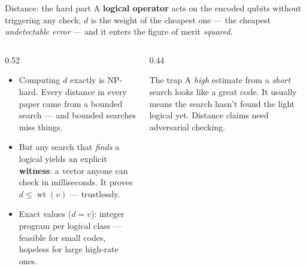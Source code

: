 \documentclass[11pt,aspectratio=169]{beamer}
\newcommand{\wt}{\operatorname{wt}}
\begin{document}
\begin{frame}{Distance: the hard part}
  A \textbf{logical operator} acts on the encoded qubits without triggering any
  check; $d$ is the weight of the cheapest one --- the cheapest
  \emph{undetectable error} --- and it enters the figure of merit
  \emph{squared}.
  \begin{columns}[T]
    \begin{column}{0.52\textwidth}
      \begin{itemize}\setlength{\itemsep}{6pt}
        \item \alert{Computing $d$ exactly is NP-hard.} Every distance in every
              paper came from a bounded search --- and bounded searches miss
              things.
        \item But any search that \emph{finds} a logical yields an explicit
              \textbf{witness}: a vector anyone can check in milliseconds.
              It proves $d \le \wt(v)$ --- trustlessly.
        \item Exact values ($d = v$): integer program per logical class ---
              feasible for small codes, hopeless for large high-rate ones.
      \end{itemize}
    \end{column}
    \begin{column}{0.44\textwidth}
      \begin{alertblock}{The trap}
        A \emph{high} estimate from a \emph{short} search looks like a great
        code. It usually means the search hasn't found the light logical yet.
        Distance claims need adversarial checking.
      \end{alertblock}
    \end{column}
  \end{columns}
\end{frame}
\end{document}
